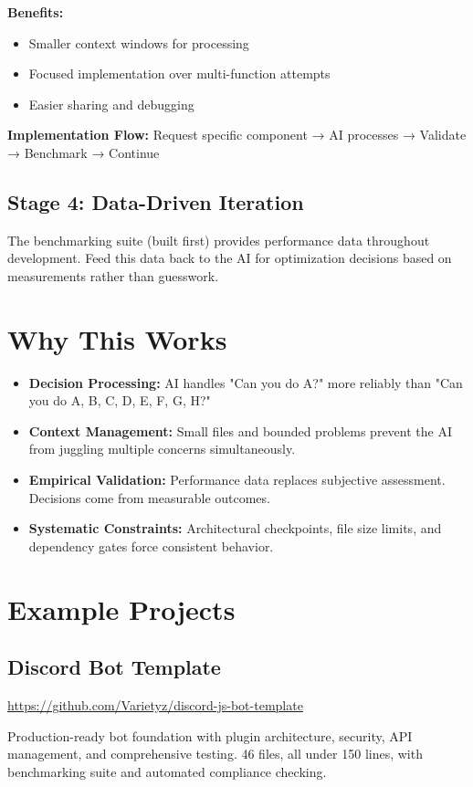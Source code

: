 \documentclass{article}
\begin{document}
\textbf{Benefits:}
\begin{itemize}[noitemsep]
\item Smaller context windows for processing
\item Focused implementation over multi-function attempts
\item Easier sharing and debugging
\end{itemize}

\textbf{Implementation Flow:} Request specific component → AI processes → Validate → Benchmark → Continue

\subsection{Stage 4: Data-Driven Iteration}
The benchmarking suite (built first) provides performance data throughout development. Feed this data back to the AI for optimization decisions based on measurements rather than guesswork.

\section{Why This Works}

\begin{itemize}[noitemsep]
\item \textbf{Decision Processing:} AI handles "Can you do A?" more reliably than "Can you do A, B, C, D, E, F, G, H?"
\item \textbf{Context Management:} Small files and bounded problems prevent the AI from juggling multiple concerns simultaneously.
\item \textbf{Empirical Validation:} Performance data replaces subjective assessment. Decisions come from measurable outcomes.
\item \textbf{Systematic Constraints:} Architectural checkpoints, file size limits, and dependency gates force consistent behavior.
\end{itemize}

\section{Example Projects}

\subsection{Discord Bot Template}
\url{https://github.com/Varietyz/discord-js-bot-template}

Production-ready bot foundation with plugin architecture, security, API management, and comprehensive testing. 46 files, all under 150 lines, with benchmarking suite and automated compliance checking.
\end{document}
